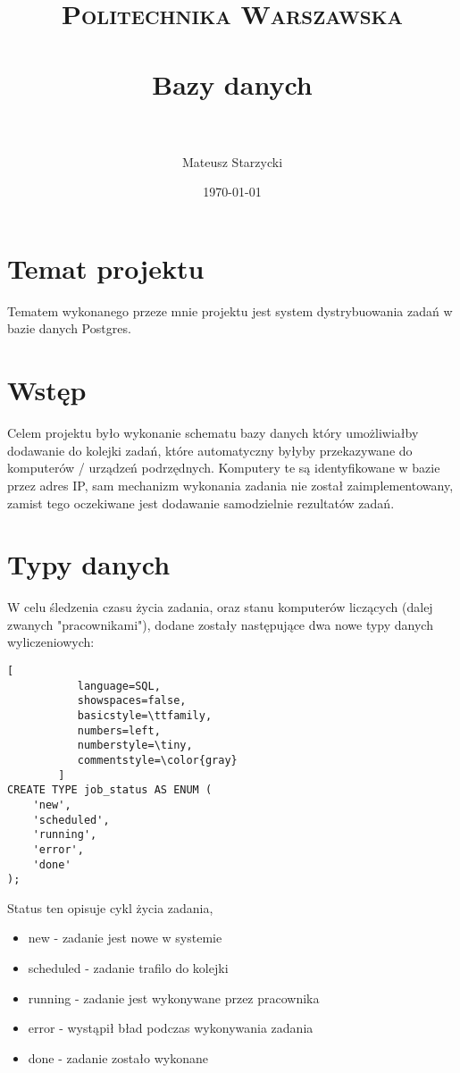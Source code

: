 \documentclass[paper=a4, fontsize=11pt]{scrartcl} %
\title{ 
    \normalfont \normalsize 
    \textsc{Politechnika Warszawska} \\ [25pt] %
    \horrule{0.5pt} \\[0.4cm] %
    \huge Bazy danych\\ %
    \horrule{2pt} \\[0.5cm] %
}
\author{Mateusz Starzycki} %
\date{\normalsize\today} %
\numberwithin{equation}{section} %
\numberwithin{figure}{section} %
\numberwithin{table}{section} %
\begin{document}
\maketitle %


\newpage
\section{Temat projektu}

Tematem wykonanego przeze mnie projektu jest system dystrybuowania zadań w bazie danych Postgres.


\newpage
\section {Wstęp}


Celem projektu było wykonanie schematu bazy danych który umożliwiałby dodawanie do kolejki zadań,
które automatyczny byłyby przekazywane do komputerów / urządzeń podrzędnych.
Komputery te są identyfikowane w bazie przez adres IP, sam mechanizm wykonania zadania nie został
zaimplementowany, zamist tego oczekiwane jest dodawanie samodzielnie rezultatów zadań.

\section {Typy danych}

W celu śledzenia czasu życia zadania, oraz stanu komputerów liczących (dalej zwanych "pracownikami"),
dodane zostały następujące dwa nowe typy danych wyliczeniowych:


\begin{lstlisting}[
           language=SQL,
           showspaces=false,
           basicstyle=\ttfamily,
           numbers=left,
           numberstyle=\tiny,
           commentstyle=\color{gray}
        ]
CREATE TYPE job_status AS ENUM (
    'new',
    'scheduled',
    'running',
    'error',
    'done'
);
\end{lstlisting}

Status ten opisuje cykl życia zadania,
\begin{itemize}
  \item new - zadanie jest nowe w systemie
  \item scheduled - zadanie trafilo do kolejki
  \item running - zadanie jest wykonywane przez pracownika
  \item error - wystąpił bład podczas wykonywania zadania
  \item done - zadanie zostało wykonane
\end{itemize}
\end{document}
